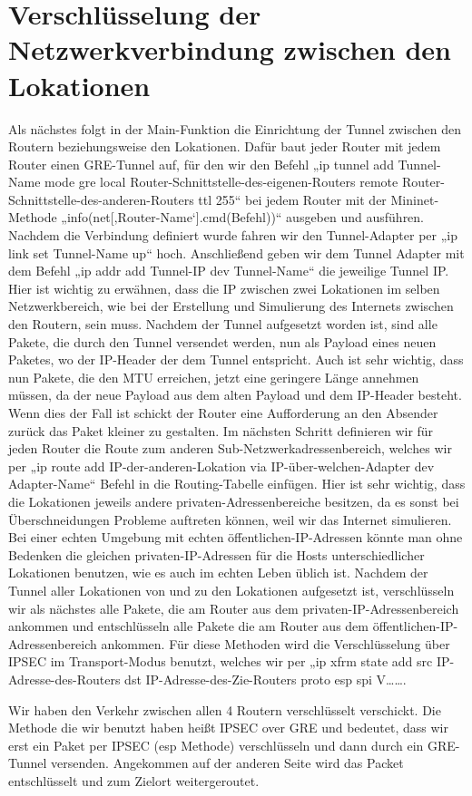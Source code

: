 \documentclass[fontsize=12pt,paper=a4,open=any,parskip=half,
  twoside=false,toc=listof,toc=bibliography,fleqn,leqno,
  captions=nooneline,captions=tableabove,british]{scrbook}
\begin{document}
\section{Verschlüsselung der Netzwerkverbindung zwischen den Lokationen}
Als nächstes folgt in der Main-Funktion die Einrichtung der Tunnel zwischen den Routern beziehungsweise den Lokationen. Dafür baut jeder Router mit jedem Router einen GRE-Tunnel auf, für den wir den Befehl „ip tunnel add Tunnel-Name mode gre local Router-Schnittstelle-des-eigenen-Routers remote Router-Schnittstelle-des-anderen-Routers ttl 255“ bei jedem Router mit der Mininet-Methode „info(net[‚Router-Name‘].cmd(Befehl))“ ausgeben und ausführen. Nachdem die Verbindung definiert wurde fahren wir den Tunnel-Adapter per „ip link set Tunnel-Name up“ hoch. Anschließend geben wir dem Tunnel Adapter mit dem Befehl „ip addr add Tunnel-IP dev Tunnel-Name“ die jeweilige Tunnel IP. Hier ist wichtig zu erwähnen, dass die IP zwischen zwei Lokationen im selben Netzwerkbereich, wie bei der Erstellung und Simulierung des Internets zwischen den Routern, sein muss. Nachdem der Tunnel aufgesetzt worden ist, sind alle Pakete, die durch den Tunnel versendet werden, nun als Payload eines neuen Paketes, wo der IP-Header der dem Tunnel entspricht. Auch ist sehr wichtig, dass nun Pakete, die den MTU erreichen, jetzt eine geringere Länge annehmen müssen, da der neue Payload aus dem alten Payload und dem IP-Header besteht. Wenn dies der Fall ist schickt der Router eine Aufforderung an den Absender zurück das Paket kleiner zu gestalten.
Im nächsten Schritt definieren wir für jeden Router die Route zum anderen Sub-Netzwerkadressenbereich, welches wir per „ip route add IP-der-anderen-Lokation via IP-über-welchen-Adapter dev Adapter-Name“ Befehl in die Routing-Tabelle einfügen. Hier ist sehr wichtig, dass die Lokationen jeweils andere privaten-Adressenbereiche besitzen, da es sonst bei Überschneidungen Probleme auftreten können, weil wir das Internet simulieren. Bei einer echten Umgebung mit echten öffentlichen-IP-Adressen könnte man ohne Bedenken die gleichen privaten-IP-Adressen für die Hosts unterschiedlicher Lokationen benutzen, wie es auch im echten Leben üblich ist.
Nachdem der Tunnel aller Lokationen von und zu den Lokationen aufgesetzt ist, verschlüsseln wir als nächstes alle Pakete, die am Router aus dem privaten-IP-Adressenbereich ankommen und entschlüsseln alle Pakete die am Router aus dem öffentlichen-IP-Adressenbereich ankommen. Für diese Methoden wird die Verschlüsselung über IPSEC im Transport-Modus benutzt, welches wir per „ip xfrm state add src IP-Adresse-des-Routers dst IP-Adresse-des-Zie-Routers proto esp spi V……. 
\par
Wir haben den Verkehr zwischen allen 4 Routern verschlüsselt verschickt. Die Methode die wir benutzt haben heißt IPSEC over GRE und bedeutet, dass wir erst ein Paket per IPSEC (esp Methode) verschlüsseln und dann durch ein GRE-Tunnel versenden. Angekommen auf der anderen Seite wird das Packet entschlüsselt und zum Zielort weitergeroutet.
\end{document}
